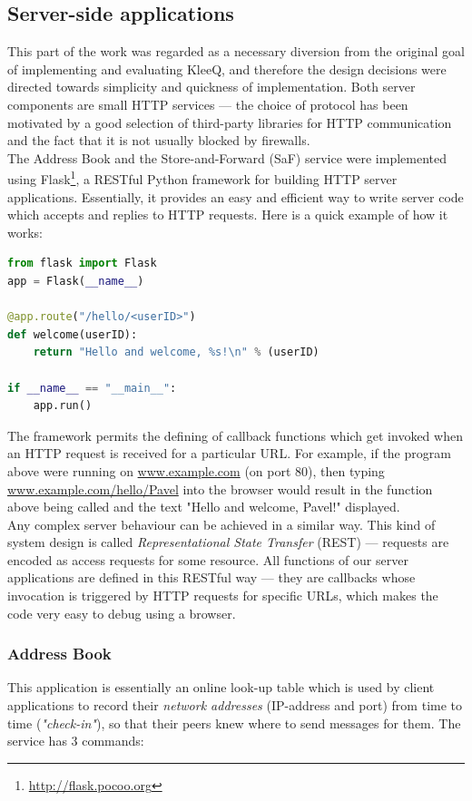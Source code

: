 \documentclass[a4paper, twoside, 12pt]{report}
\begin{document}
\subsection{Server-side applications}
\label{subsec:impl.prep.server}
This part of the work was regarded as a necessary diversion from the original goal of implementing and evaluating KleeQ, and therefore the design decisions were directed towards simplicity and quickness of implementation. Both server components are small HTTP services --- the choice of protocol has been motivated by a good selection of third-party libraries for HTTP communication and the fact that it is not usually blocked by firewalls.\\

The Address Book and the Store-and-Forward (SaF) service were implemented using Flask\footnote{\url{http://flask.pocoo.org}}, a RESTful Python framework for building HTTP server applications. Essentially, it provides an easy and efficient way to write server code which accepts and replies to HTTP requests. Here is a quick example of how it works: \\

\begin{lstlisting}[language = Python, columns=fullflexible]
from flask import Flask
app = Flask(__name__)

@app.route("/hello/<userID>")
def welcome(userID):
    return "Hello and welcome, %s!\n" % (userID)
    
if __name__ == "__main__":
    app.run()
\end{lstlisting}


The framework permits the defining of callback functions which get invoked when an HTTP request is received for a particular URL. For example, if the program above were running on \url{www.example.com} (on port 80), then typing \url{www.example.com/hello/Pavel} into the browser would result in the function above being called and the text "Hello and welcome, Pavel!" displayed. \\

Any complex server behaviour can be achieved in a similar way. This kind of system design is called \emph{Representational State Transfer} (REST) --- requests are encoded as access requests for some resource.  All functions of our server applications are defined in this RESTful way --- they are callbacks whose invocation is triggered by HTTP requests for specific URLs, which makes the code very easy to debug using a browser.

\subsubsection{Address Book}
This application is essentially an online look-up table which is used by client applications to record their \emph{network addresses} (IP-address and port) from time to time (\emph{"check-in"}), so that their peers knew where to send messages for them. The service has 3 commands:
\end{document}
